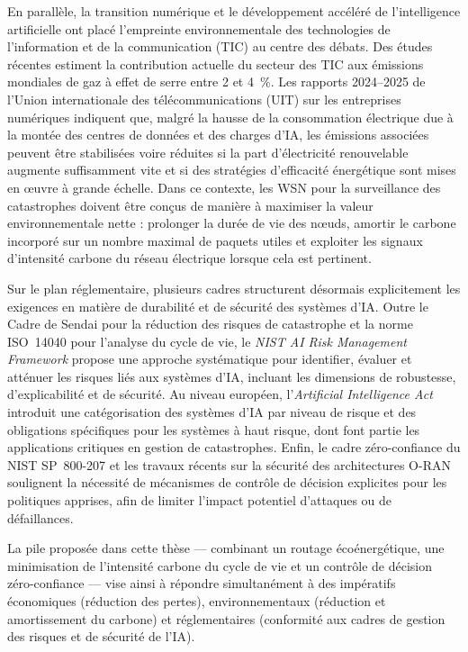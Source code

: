 En parallèle, la transition numérique et le développement accéléré de l'intelligence artificielle ont placé l'empreinte environnementale des technologies de l'information et de la communication (TIC) au centre des débats. Des études récentes estiment la contribution actuelle du secteur des TIC aux émissions mondiales de gaz à effet de serre entre 2 et 4~\%\cite{freitag2021ict,andrae2021real_climate}. Les rapports 2024--2025 de l'Union internationale des télécommunications (UIT) sur les entreprises numériques indiquent que, malgré la hausse de la consommation électrique due à la montée des centres de données et des charges d'IA, les émissions associées peuvent être stabilisées voire réduites si la part d'électricité renouvelable augmente suffisamment vite et si des stratégies d'efficacité énergétique sont mises en œuvre à grande échelle\cite{itu_ict2025,ember2024}. Dans ce contexte, les WSN pour la surveillance des catastrophes doivent être conçus de manière à maximiser la valeur environnementale nette : prolonger la durée de vie des nœuds, amortir le carbone incorporé sur un nombre maximal de paquets utiles et exploiter les signaux d'intensité carbone du réseau électrique lorsque cela est pertinent\cite{pirson2021embodied,aioti2024carbon,carbon_signals_acm2025}.

Sur le plan réglementaire, plusieurs cadres structurent désormais explicitement les exigences en matière de durabilité et de sécurité des systèmes d'IA. Outre le Cadre de Sendai pour la réduction des risques de catastrophe\cite{UNDRR2015Sendai} et la norme ISO~14040 pour l'analyse du cycle de vie\cite{iso14040}, le \emph{NIST AI Risk Management Framework} propose une approche systématique pour identifier, évaluer et atténuer les risques liés aux systèmes d'IA, incluant les dimensions de robustesse, d'explicabilité et de sécurité\cite{nist2023airisk}. Au niveau européen, l'\emph{Artificial Intelligence Act} introduit une catégorisation des systèmes d'IA par niveau de risque et des obligations spécifiques pour les systèmes à haut risque, dont font partie les applications critiques en gestion de catastrophes\cite{euaiact2024}. Enfin, le cadre zéro-confiance du NIST SP~800-207 et les travaux récents sur la sécurité des architectures O-RAN soulignent la nécessité de mécanismes de contrôle de décision explicites pour les politiques apprises, afin de limiter l'impact potentiel d'attaques ou de défaillances\cite{rose2020nist,polese2023oran,ahmadi2025zt_segmentation,ztaiot_acm2025}.

La pile proposée dans cette thèse — combinant un routage écoénergétique, une minimisation de l'intensité carbone du cycle de vie et un contrôle de décision zéro-confiance — vise ainsi à répondre simultanément à des impératifs économiques (réduction des pertes), environnementaux (réduction et amortissement du carbone) et réglementaires (conformité aux cadres de gestion des risques et de sécurité de l'IA)\cite{freitag2021ict,pirson2021embodied,rose2020nist,itu_ict2025}.

